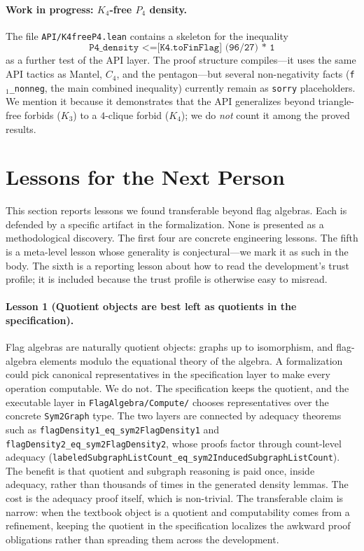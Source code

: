 \documentclass{article}
\newcommand{\lean}[1]{\texttt{#1}}
\begin{document}
\paragraph{Work in progress: $K_4$-free $P_4$ density.}
The file \lean{API/K4freeP4.lean} contains a skeleton for the
inequality
\[
  \lean{P4\_density <=[K4.toFinFlag] (96/27) * 1}
\]
as a further test of the API layer.  The proof structure compiles---it uses
the same API tactics as Mantel, $C_4$, and the pentagon---but several
non-negativity facts (\lean{f}$_1$\lean{\_nonneg}, the main combined
inequality) currently remain as \lean{sorry} placeholders.  We mention it
because it demonstrates that the API generalizes beyond triangle-free
forbids ($K_3$) to a $4$-clique forbid ($K_4$); we do \emph{not} count it
among the proved results.


\section{Lessons for the Next Person}
\label{sec:lessons}

This section reports lessons we found transferable beyond flag algebras.
Each is defended by a specific artifact in the formalization.  None is
presented as a methodological discovery.  The first four are concrete
engineering lessons.  The fifth is a meta-level lesson whose generality is
conjectural---we mark it as such in the body.  The sixth is a reporting
lesson about how to read the development's trust profile; it is included
because the trust profile is otherwise easy to misread.

\paragraph{Lesson 1 (Quotient objects are best left as quotients in the
specification).}
Flag algebras are naturally quotient objects: graphs up to isomorphism, and
flag-algebra elements modulo the equational theory of the algebra.  A
formalization could pick canonical representatives in the specification
layer to make every operation computable.  We do not.  The specification
keeps the quotient, and the executable layer in \texttt{FlagAlgebra/Compute/}
chooses representatives over the concrete \lean{Sym2Graph} type.  The two
layers are connected by adequacy theorems such as
\lean{flagDensity1\_eq\_sym2FlagDensity1} and
\lean{flagDensity2\_eq\_sym2FlagDensity2}, whose proofs factor through
count-level adequacy
(\lean{labeledSubgraphListCount\_eq\_sym2InducedSubgraphListCount}).  The
benefit is that quotient and subgraph reasoning is paid once, inside
adequacy, rather than thousands of times in the generated density lemmas.
The cost is the adequacy proof itself, which is non-trivial.  The
transferable claim is narrow: when the textbook object is a quotient and
computability comes from a refinement, keeping the quotient in the
specification localizes the awkward proof obligations rather than spreading
them across the development.
\end{document}

